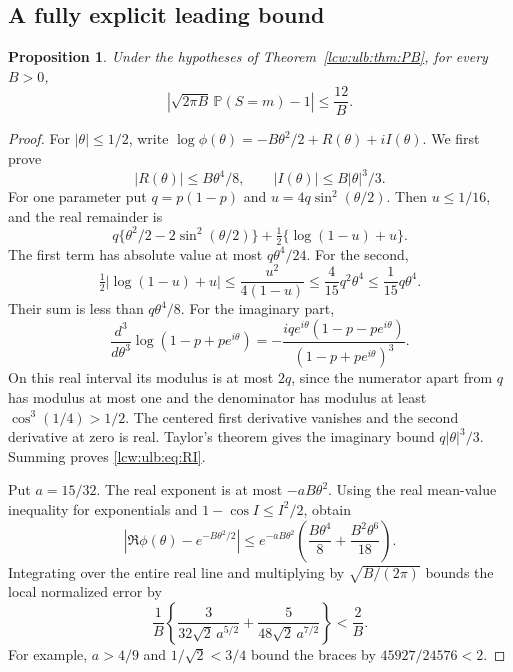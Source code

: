 \documentclass[11pt,letterpaper]{article}
\newtheorem{proposition}[theorem]{Proposition}
\theoremstyle{remark}\newtheorem{remark}[theorem]{Remark}
\newcommand{\Prob}{\mathbb P}
\begin{document}
\subsection{A fully explicit leading bound}

\begin{proposition}\label{lcw:ulb:prop:PBexplicit}
Under the hypotheses of Theorem~\ref{lcw:ulb:thm:PB}, for every $B>0$,
\begin{equation}\label{lcw:ulb:eq:PBexplicit}
 \left|\sqrt{2\pi B}\,\Prob(S=m)-1\right|\le\frac{12}{B}.
\end{equation}
\end{proposition}

\begin{proof}
For $|\theta|\le1/2$, write
$\log\phi(\theta)=-B\theta^2/2+R(\theta)+iI(\theta)$.
We first prove
\begin{equation}\label{lcw:ulb:eq:RI}
 |R(\theta)|\le B\theta^4/8,
 \qquad |I(\theta)|\le B|\theta|^3/3.
\end{equation}
For one parameter put $q=p(1-p)$ and $u=4q\sin^2(\theta/2)$.
Then $u\le1/16$, and the real remainder is
\[
 q\{\theta^2/2-2\sin^2(\theta/2)\}
       +\tfrac12\{\log(1-u)+u\}.
\]
The first term has absolute value at most $q\theta^4/24$.
For the second,
\[
 \tfrac12|\log(1-u)+u|
 \le\frac{u^2}{4(1-u)}
 \le\frac4{15}q^2\theta^4\le\frac1{15}q\theta^4.
\]
Their sum is less than $q\theta^4/8$. For the imaginary part,
\[
 \frac{d^3}{d\theta^3}\log(1-p+pe^{i\theta})
 =-\frac{iqe^{i\theta}(1-p-pe^{i\theta})}
          {(1-p+pe^{i\theta})^3}.
\]
On this real interval its modulus is at most $2q$, since the
numerator apart from $q$ has modulus at most one and the denominator
has modulus at least $\cos^3(1/4)>1/2$. The centered first derivative
vanishes and the second derivative at zero is real. Taylor's theorem
gives the imaginary bound $q|\theta|^3/3$. Summing proves
\eqref{lcw:ulb:eq:RI}.

Put $a=15/32$. The real exponent is at most $-aB\theta^2$.
Using the real mean-value inequality for exponentials and
$1-\cos I\le I^2/2$, obtain
\[
 |\Re\phi(\theta)-e^{-B\theta^2/2}|
 \le e^{-aB\theta^2}
       \left(\frac{B\theta^4}{8}+\frac{B^2\theta^6}{18}\right).
\]
Integrating over the entire real line and multiplying by
$\sqrt{B/(2\pi)}$ bounds the local normalized error by
\[
 \frac1B\left\{
 \frac{3}{32\sqrt2\,a^{5/2}}
 +\frac{5}{48\sqrt2\,a^{7/2}}\right\}<\frac2B.
\]
For example, $a>4/9$ and $1/\sqrt2<3/4$ bound the braces by
$45927/24576<2$.


\end{proof}
\end{document}
